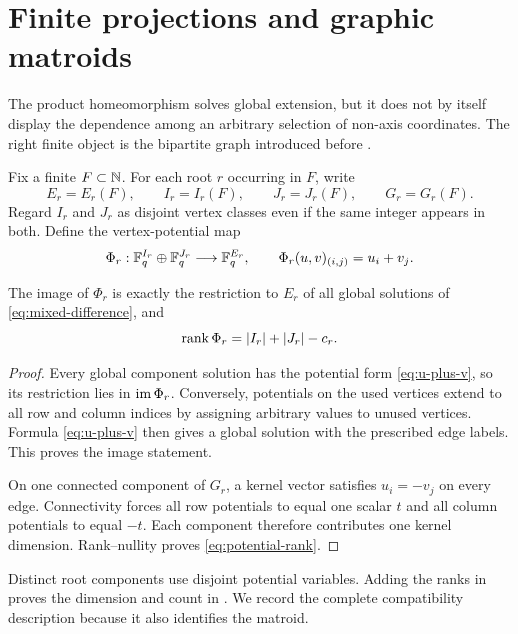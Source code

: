 \section{Finite projections and graphic matroids}\label{sec:finite}

The product homeomorphism solves global extension, but it does not by itself
display the dependence among an arbitrary selection of non-axis coordinates.
The right finite object is the bipartite graph introduced before
.

Fix a finite $F\subset\mathbb N$.  For each root $r$ occurring in $F$, write
\[
 E_r=E_r(F),\qquad I_r=I_r(F),\qquad J_r=J_r(F),
 \qquad G_r=G_r(F).
\]
Regard $I_r$ and $J_r$ as disjoint vertex classes even if the same integer
appears in both.  Define the vertex-potential map
\begin{equation}\label{eq:potential-map}
 \Phi_r:\mathbb F_q^{I_r}\oplus\mathbb F_q^{J_r}\longrightarrow\mathbb F_q^{E_r},
 \qquad
 \Phi_r(u,v)_{(i,j)}=u_i+v_j.
\end{equation}

\begin{lemma}\label{lem:potential-rank}
The image of $\Phi_r$ is exactly the restriction to $E_r$ of all global
solutions of \eqref{eq:mixed-difference}, and
\begin{equation}\label{eq:potential-rank}
 \operatorname{rank}\Phi_r=|I_r|+|J_r|-c_r.
\end{equation}
\end{lemma}

\begin{proof}
Every global component solution has the potential form
\eqref{eq:u-plus-v}, so its restriction lies in $\operatorname{im}\Phi_r$.  Conversely,
potentials on the used vertices extend to all row and column indices by
assigning arbitrary values to unused vertices.  Formula
\eqref{eq:u-plus-v} then gives a global solution with the prescribed edge
labels.  This proves the image statement.

On one connected component of $G_r$, a kernel vector satisfies
$u_i=-v_j$ on every edge.  Connectivity forces all row potentials to equal
one scalar $t$ and all column potentials to equal $-t$.  Each component
therefore contributes one kernel dimension.  Rank--nullity proves
\eqref{eq:potential-rank}.
\end{proof}

Distinct root components use disjoint potential variables.  Adding the ranks
in  proves the dimension and count in
.  We record the complete compatibility description because it
also identifies the matroid.

